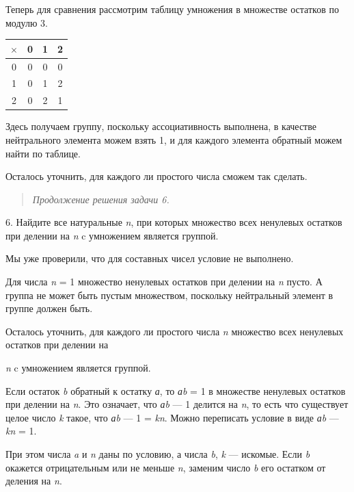 \documentclass[12pt]{article}
\begin{document}
    Теперь для сравнения рассмотрим таблицу умножения в множестве остатков
    по модулю 3.

    \begin{tabular}{|c|c|c|c|}
        \hline
        $\times$ & 0 & 1 & 2 \\
        \hline
        0        & 0 & 0 & 0 \\
        \hline
        1        & 0 & 1 & 2 \\
        \hline
        2        & 0 & 2 & 1 \\
        \hline
    \end{tabular}

    Здесь получаем группу, поскольку ассоциативность выполнена, в качестве
    нейтрального элемента можем взять 1, и для каждого элемента обратный
    можем найти по таблице.

    Осталось уточнить, для каждого ли простого числа сможем так сделать.

    \begin{quote}
        \emph{Продолжение решения задачи 6.}
    \end{quote}

    6. Найдите все натуральные \emph{n}, при которых множество всех
    ненулевых остатков при делении на \emph{n} c умножением является
    группой.

    Мы уже проверили, что для составных чисел условие не выполнено.

    Для числа \emph{n} = 1 множество ненулевых остатков при делении на
    \emph{n} пусто. А группа не может быть пустым множеством, поскольку
    нейтральный элемент в группе должен быть.

    Осталось уточнить, для каждого ли простого числа \emph{n} множество всех
    ненулевых остатков при делении на

    \emph{n} c умножением является группой.

    Если остаток \emph{b} обратный к остатку \emph{а}, то \emph{аb} = 1 в
    множестве ненулевых остатков при делении на \emph{n}. Это означает, что
    \emph{аb} --- 1 делится на \emph{n}, то есть что существует целое число
    \emph{k} такое, что \emph{аb} --- 1 = \emph{kn}. Можно переписать условие
    в виде \emph{аb} --- \emph{kn} = 1.

    При этом числа \emph{a} и \emph{n} даны по условию, а числа \emph{b},
    \emph{k} --- искомые. Если \emph{b} окажется отрицательным или не меньше
    \emph{n}, заменим число \emph{b} его остатком от деления на \emph{n}.
\end{document}
